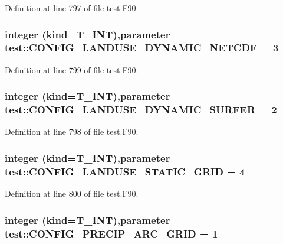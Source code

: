Definition at line 797 of file test.F90.

\hypertarget{namespacetest_aab4a8dc605bb8e9806d7678f36996890}{
\subsubsection[{CONFIG\_\-LANDUSE\_\-DYNAMIC\_\-NETCDF}]{\setlength{\rightskip}{0pt plus 5cm}integer (kind={\bf T\_\-INT}),parameter {\bf test::CONFIG\_\-LANDUSE\_\-DYNAMIC\_\-NETCDF} = 3}}
\label{namespacetest_aab4a8dc605bb8e9806d7678f36996890}


Definition at line 799 of file test.F90.

\hypertarget{namespacetest_ab4d98418b10a5c419d3848523699bd61}{
\subsubsection[{CONFIG\_\-LANDUSE\_\-DYNAMIC\_\-SURFER}]{\setlength{\rightskip}{0pt plus 5cm}integer (kind={\bf T\_\-INT}),parameter {\bf test::CONFIG\_\-LANDUSE\_\-DYNAMIC\_\-SURFER} = 2}}
\label{namespacetest_ab4d98418b10a5c419d3848523699bd61}


Definition at line 798 of file test.F90.

\hypertarget{namespacetest_a3fa05e57e81cd6db482ec5db47f0de07}{
\subsubsection[{CONFIG\_\-LANDUSE\_\-STATIC\_\-GRID}]{\setlength{\rightskip}{0pt plus 5cm}integer (kind={\bf T\_\-INT}),parameter {\bf test::CONFIG\_\-LANDUSE\_\-STATIC\_\-GRID} = 4}}
\label{namespacetest_a3fa05e57e81cd6db482ec5db47f0de07}


Definition at line 800 of file test.F90.

\hypertarget{namespacetest_a2b72dfa965e7c91b8b844dfda4430890}{
\subsubsection[{CONFIG\_\-PRECIP\_\-ARC\_\-GRID}]{\setlength{\rightskip}{0pt plus 5cm}integer (kind={\bf T\_\-INT}),parameter {\bf test::CONFIG\_\-PRECIP\_\-ARC\_\-GRID} = 1}}
\label{namespacetest_a2b72dfa965e7c91b8b844dfda4430890}


